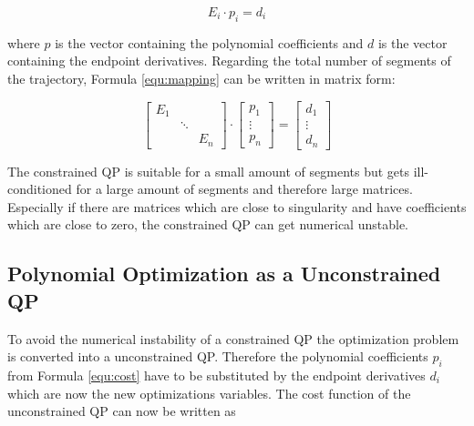 \begin{equation}
E_i \cdot p_i = d_i
\label{equ:mapping}
\end{equation}

where $p$ is the vector containing the polynomial coefficients and $d$ is the vector containing the endpoint derivatives. Regarding the total number of segments of the trajectory, Formula \ref{equ:mapping} can be written in matrix form:

\begin{equation}
\begin{bmatrix}
   E_1 &  &  \\
    & \ddots &  \\
   & & E_n
\end{bmatrix} 
\cdot
\begin{bmatrix}
   p_1 \\
\vdots \\
  p_n
\end{bmatrix}
=
\begin{bmatrix}
   d_1 \\
\vdots \\
  d_n
\end{bmatrix}
\end{equation} 

The constrained QP is suitable for a small amount of segments but gets ill-conditioned for a large amount of segments and therefore large matrices. Especially if there are matrices which are close to singularity and have coefficients which are close to zero, the constrained QP can get numerical unstable.

\subsection{Polynomial Optimization as a Unconstrained QP}

To avoid the numerical instability of a constrained QP the optimization problem is converted into a unconstrained QP. Therefore the polynomial coefficients $p_i$ from Formula \ref{equ:cost} have to be substituted by the endpoint derivatives $d_i$ which are now the new optimizations variables. The cost function of the unconstrained QP can now be written as 

